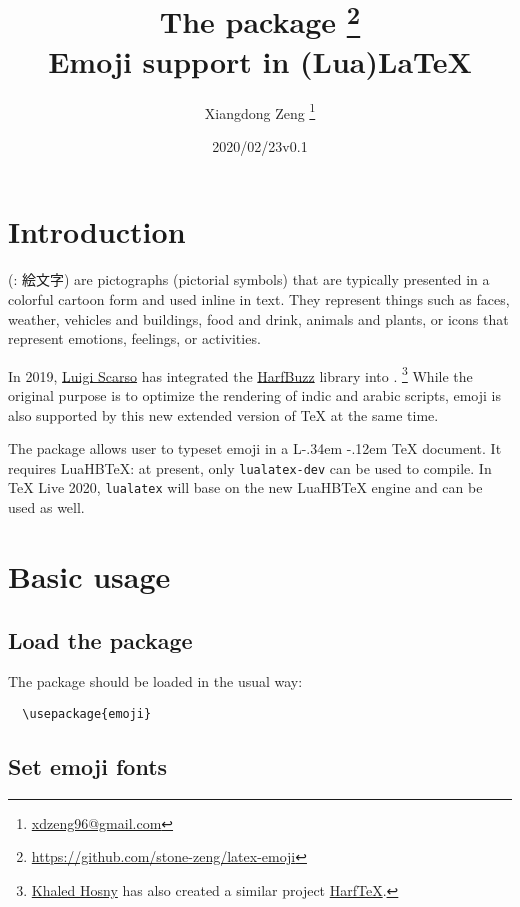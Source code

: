 \documentclass{l3doc}
\title{The \pkg{emoji} package \thanks{\url{https://github.com/stone-zeng/latex-emoji}} \\
  Emoji support in (Lua)\LaTeX}
\author{Xiangdong Zeng \thanks{\url{xdzeng96@gmail.com}}}
\date{\emoji{date} 2020/02/23\quad v0.1}
\DeclareRobustCommand{\LaTeX}{
  L\kern-.34em
  \raisebox{.36ex}{\scalebox{0.9}{\textsc{a}}}
  \kern-.12em
  \TeX}
\def\LuaHBTeX{LuaHB\TeX}
\begin{document}
\maketitle

\tableofcontents

\section{ Introduction}

 (: {\fontja 絵文字}) are pictographs (pictorial symbols) that are
typically presented in a colorful cartoon form and used inline in text. They represent things
such as faces, weather, vehicles and buildings, food and drink, animals and plants, or icons
that represent emotions, feelings, or activities.\textsuperscript{\cite{utr51}}

In 2019, \href{https://github.com/luigiScarso}{Luigi Scarso} has integrated the
\href{https://github.com/harfbuzz/harfbuzz}{HarfBuzz} library into \LuaTeX.%
\footnote{\href{https://github.com/khaledhosny}{Khaled Hosny} has also created a similar project
\href{https://github.com/khaledhosny/harftex}{HarfTeX}.}
While the original purpose is to optimize the rendering of indic and arabic scripts, emoji is
also supported by this new extended version of \TeX{} at the same time.

The  package allows user to typeset emoji in a \LaTeX{} document. It requires
\LuaHBTeX{}: at present, only \texttt{lualatex-dev} can be used to compile. In \TeX{} Live 2020,
\texttt{lualatex} will base on the new \LuaHBTeX{} engine and can be used as well.

\section{ Basic usage}

\subsection{ Load the package}

The package should be loaded in the usual way:

\begin{verbatim}
  \usepackage{emoji}
\end{verbatim}

\subsection{ Set emoji fonts}
\end{document}
